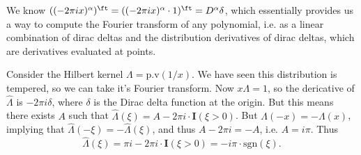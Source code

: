 \begin{example}
    We know $((-2 \pi i x)^\alpha)^\ft = ((- 2 \pi i x)^\alpha \cdot 1)^\ft = D^\alpha \delta$, which essentially provides us a way to compute the Fourier transform of any polynomial, i.e. as a linear combination of dirac deltas and the distribution derivatives of dirac deltas, which are derivatives evaluated at points.
\end{example}

\begin{example}
    Consider the Hilbert kernel $\Lambda = \text{p.v}(1/x)$. We have seen this distribution is tempered, so we can take it's Fourier transform. Now $x \Lambda = 1$, so the dericative of $\widehat{\Lambda}$ is $- 2 \pi i \delta$, where $\delta$ is the Dirac delta function at the origin. But this means there exists $A$ such that $\widehat{\Lambda}(\xi) = A - 2 \pi i \cdot \mathbf{I}(\xi > 0)$. But $\Lambda(-x) = - \Lambda(x)$, implying that $\widehat{\Lambda}(-\xi) = -\widehat{\Lambda}(\xi)$, and thus $A - 2 \pi i = -A$, i.e. $A = i \pi$. Thus
    \[ \widehat{\Lambda}(\xi) = \pi i - 2 \pi i \cdot \mathbf{I}(\xi > 0) = - i \pi \cdot \text{sgn}(\xi). \]
\end{example}


